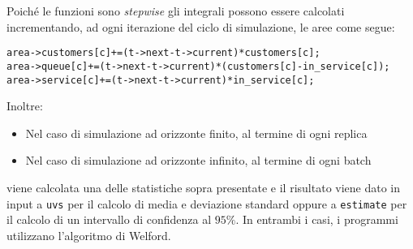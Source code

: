 Poiché le funzioni sono \textit{stepwise} gli integrali possono essere calcolati incrementando, ad ogni iterazione del ciclo di simulazione, le aree come segue:
\begin{lstlisting}[caption={Calcolo degli integrali}]
area->customers[c]+=(t->next-t->current)*customers[c];
area->queue[c]+=(t->next-t->current)*(customers[c]-in_service[c]);
area->service[c]+=(t->next-t->current)*in_service[c];
\end{lstlisting}

Inoltre:
\begin{itemize}
\item Nel caso di simulazione ad orizzonte finito, al termine di ogni replica 
\item Nel caso di simulazione ad orizzonte infinito, al termine di ogni batch
\end{itemize}
viene calcolata una delle statistiche sopra presentate e il risultato viene dato in input a \texttt{uvs} per il calcolo di media e deviazione standard oppure a \texttt{estimate} per il calcolo di un intervallo di confidenza al $95\%$. In entrambi i casi, i programmi utilizzano l'algoritmo di Welford.